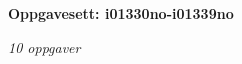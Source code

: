 \centerline{\bf Oppgavesett: i01330no-i01339no}
\vskip 10pt
\centerline{\it 10 oppgaver}\vskip 10pt
\vskip 10pt
